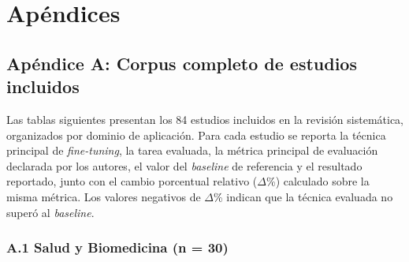 \chapter{Apéndices}

\section*{Apéndice A: Corpus completo de estudios incluidos}

Las tablas siguientes presentan los 84 estudios incluidos en la revisión sistemática, organizados por dominio de aplicación. Para cada estudio se reporta la técnica principal de \textit{fine-tuning}, la tarea evaluada, la métrica principal de evaluación declarada por los autores, el valor del \textit{baseline} de referencia y el resultado reportado, junto con el cambio porcentual relativo ($\Delta$\%) calculado sobre la misma métrica. Los valores negativos de $\Delta$\% indican que la técnica evaluada no superó al \textit{baseline}.

\subsection*{A.1 \quad Salud y Biomedicina \texorpdfstring{(n = 30)}{(n = 30)}}

